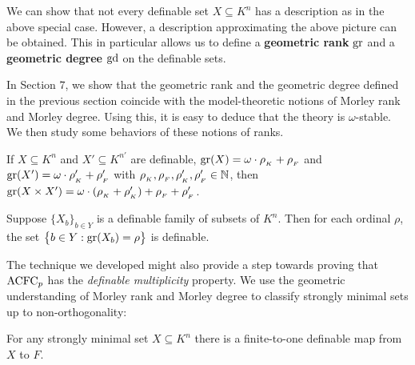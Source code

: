 \noindent We can show that not every definable set $X \subseteq K^n$ has a description as in the above special case.
However, a description approximating the above picture can be obtained. This in particular allows us to define a {\bf geometric rank} $\mathrm{gr}$  and a {\bf geometric degree} $\mathrm{gd}$ on the definable sets. 
\begin{comment}
In the above special case, let $\mr_K$ be the Morley rank  of $V_\alpha$ in the $\ACF$-model $K$ for some $\alpha \in D$, let $\mr_F, \md_F$ be the Morley rank and Morley degree of $D$ in the $\ACF$-model $F$. (Note that we can replace Morley rank and Morley degree here by any other reasonable notions of dimension and multiplicity.) Then the dimension and multiplicity of the definable set $X$ is $\omega\cdot \mr_K + \mr_F$ and $\md_F$ respectively.
\end{comment}


In Section $7$, we show that the geometric rank and the geometric degree defined in the previous section coincide with the model-theoretic notions of Morley rank and Morley degree.
Using this, it is easy to deduce that the theory is $\omega$-stable. We then study some behaviors of these notions of ranks.

\begin{prop}
If $X \subseteq K^n$ and $ X'\subseteq K^{n'}$ are definable, $\mathrm{gr}(X) = \omega\cdot \rho_{{}_K} + \rho_{{}_F}$ and $  \mathrm{gr}(X') = \omega\cdot \rho'_{{}_K} + \rho'_{{}_F}$ with $\rho_{{}_K}, \rho_{{}_F}, \rho'_{{}_K}, \rho'_{{}_F} \in \mathbb{N}$,  then  $\mathrm{gr}(X\times X') = \omega\cdot (\rho_{{}_K}+\rho'_{{}_K}) +\rho_{{}_F}+\rho'_{{}_F}$.
\end{prop}

\begin{thm}
Suppose $ \{ X_b\}_{b \in Y}$ is a definable family of subsets of $K^n$. Then for each ordinal \(\rho\), the set \( \big\{ b \in Y :  \mathrm{gr}(X_b)= \rho \big\} \) is definable.
\end{thm}

\noindent
The technique we developed might also provide a step towards proving that $\mathrm{ACFC}_p$ has the
{\em definable  multiplicity} property. 
We use the geometric understanding of Morley rank and Morley degree to classify strongly minimal sets up to non-orthogonality:

\begin{prop}
For any strongly minimal set $X \subseteq K^n$ there is a finite-to-one definable map from $X$ to $F$.
\end{prop}

